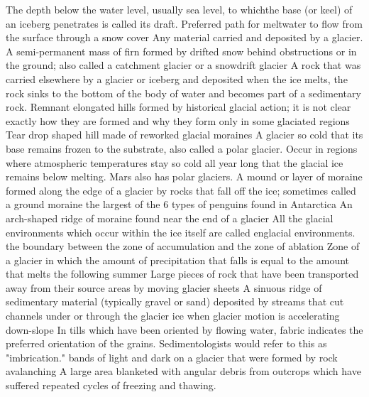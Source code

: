  The depth below the water level, usually sea level, to whichthe base (or keel) of an iceberg penetrates is called its draft.
 Preferred path for meltwater to flow from the surface through a snow cover
 Any material carried and deposited by a glacier.
 A semi-permanent mass of firn formed by drifted snow behind obstructions or in the ground; also called a catchment glacier or a snowdrift glacier
 A rock that was carried elsewhere by a glacier or iceberg and deposited when the ice melts, the rock sinks to the bottom of the body of water and becomes part of a sedimentary rock.
 Remnant elongated hills formed by historical glacial action; it is not clear exactly how they are formed and why they form only in some glaciated regions
 Tear drop shaped hill made of reworked glacial moraines
 A glacier so cold that its base remains frozen to the substrate, also called a polar glacier. Occur in regions where atmospheric temperatures stay so cold all year long that the glacial ice remains below melting. Mars also has polar glaciers.
 A mound or layer of moraine formed along the edge of a glacier by rocks that fall off the ice; sometimes called a ground moraine
 the largest of the 6 types of penguins found in Antarctica
 An arch-shaped ridge of moraine found near the end of a glacier
 All the glacial environments which occur within the ice itself are called englacial environments.
 the boundary between the zone of accumulation and the zone of ablation
 Zone of a glacier in which the amount of precipitation that falls is equal to the amount that melts the following summer
 Large pieces of rock that have been transported away from their source areas by moving glacier sheets
 A sinuous ridge of sedimentary material (typically gravel or sand) deposited by streams that cut channels under or through the glacier ice
 when glacier motion is accelerating down-slope
 In tills which have been oriented by flowing water, fabric indicates the preferred orientation of the grains. Sedimentologists would refer to this as "imbrication."
 bands of light and dark on a glacier that were formed by rock avalanching
 A large area blanketed with angular debris from outcrops which have suffered repeated cycles of freezing and thawing.
